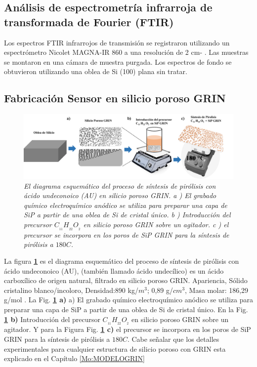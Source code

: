 \documentclass[a4paper,11pt,]{book}
\begin{document}
\subsection{Análisis de espectrometría infrarroja de transformada de Fourier (FTIR)}
Los espectros FTIR infrarrojos de transmisión se registraron utilizando un espectrómetro Nicolet MAGNA-IR 860 a una resolución de 2 cm-  . Las muestras se montaron en una cámara de muestra purgada. Los espectros de fondo se obtuvieron
utilizando una oblea de Si (100) plana sin tratar.

\subsection{Fabricación Sensor  en silicio poroso GRIN}
\begin{figure}[H]
	\centering
	\includegraphics[scale=.3]{../Images/Esquema} 
	\caption{\emph{El diagrama esquemático del proceso de síntesis de pirólisis con ácido undeconoico (AU) en silicio poroso GRIN.  a ) El grabado químico electroquímico anódico se utiliza para preparar una capa de SiP a partir de una oblea de Si de cristal único.  b ) Introducción del precursor $C_{_{11}}H_{_{22}}O_{_{2}}$ en silicio poroso GRIN sobre un agitador. c ) el precursor se incorpora en los poros de SiP GRIN para la síntesis de pirólisis a $180C$.  }}
	\label{fig:REc0}
\end{figure}
La figura \textbf{\ref{fig:REc0}} es el diagrama esquemático del proceso de síntesis de pirólisis con ácido undeconoico (AU), (también llamado ácido undecílico) es un ácido carboxílico de origen natural, filtrado en silicio poroso GRIN. Apariencia, Sólido cristalino blanco/incoloro, Densidad:890 kg/$m^3$; 0,89 g/$cm^3$, Masa molar: 186,29 g/mol \cite{UA3, UA4}. La Fig. \textbf{\ref{fig:REc0} a)}  a) El grabado químico electroquímico anódico se utiliza para preparar una capa de SiP a partir de una oblea de Si de cristal único.  En la Fig. \textbf{\ref{fig:REc0} b)} Introducción del precursor $C_{_{11}}H_{_{22}}O_{_{2}}$  en silicio poroso GRIN sobre un agitador. Y para la Figura  Fig. \textbf{\ref{fig:REc0} c) } el precursor se incorpora en los poros de SiP GRIN para la síntesis de pirólisis a $180C$. Cabe señalar que los detalles experimentales para cualquier estructura de silicio poroso con GRIN esta explicado en el Capítulo \ref{Mo:MODELOGRIN} 
\end{document}
